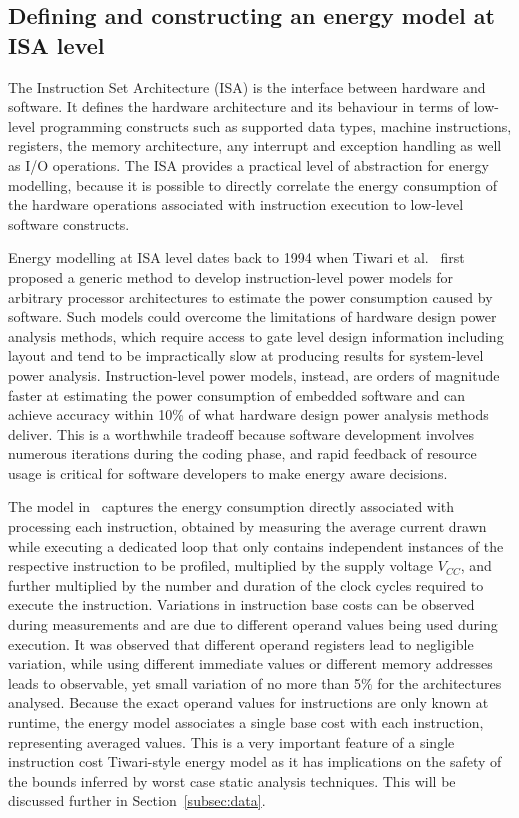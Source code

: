 \subsection{Defining and constructing an energy model at ISA level}\label{subsec:isa}

The Instruction Set Architecture (ISA) is the interface between hardware and
software. 
%
It defines the hardware architecture and its behaviour in terms of low-level
programming constructs such as supported data types, machine instructions,
registers, the memory architecture, any interrupt and exception handling as
well as I/O operations.
%
The ISA provides a practical level of abstraction for energy modelling, because
it is possible to directly correlate the energy consumption of the hardware
operations associated with instruction execution to low-level software
constructs.

Energy modelling at ISA level dates back to 1994 when Tiwari et
al.~\cite{Tiwari-embedded-1994} first proposed a
generic method to develop instruction-level power models for arbitrary
processor architectures to estimate the power consumption caused by software.
%
Such models could overcome the limitations of hardware design power analysis
methods, which require access to gate level design information including layout
and tend to be impractically slow at producing results for system-level power
analysis. Instruction-level power models, instead, are orders of magnitude
faster at estimating the power consumption of embedded software and can achieve
accuracy within 10\% of what hardware design power analysis methods deliver.
This is a worthwhile tradeoff because software development involves numerous
iterations during the coding phase, and rapid feedback of resource usage is
critical for software developers to make energy aware decisions.

The model in~\cite{Tiwari-embedded-1994} captures the energy consumption
directly associated with processing each instruction, obtained by measuring the
average current drawn while executing a dedicated loop that only contains
independent instances of the respective instruction to be profiled, multiplied
by the supply voltage $V_{CC}$, and further multiplied by the number and
duration of the clock cycles required to execute the instruction.
%
Variations in instruction base costs can be observed during measurements and
are due to different operand values being used during execution. It was observed that
different operand registers lead to negligible variation, while using different
immediate values or different memory addresses leads to observable, yet small
variation of no more than 5\% for the architectures analysed.
%
Because the exact operand values for instructions are only known at runtime,
the energy model associates a single base cost with each instruction,
representing averaged values. This is a very important feature of a single
instruction cost Tiwari-style energy model as it has implications on the safety
of the bounds inferred by worst case static analysis techniques. This will be
discussed further in Section~\ref{subsec:data}.

